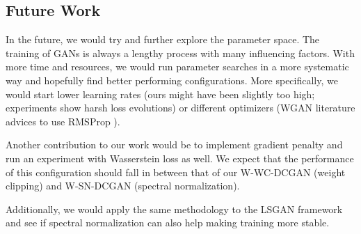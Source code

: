 
\subsection{Future Work}
In the future, we would try and further explore the parameter space. The training of GANs is always a lengthy process with many influencing factors. With more time and resources, we would run parameter searches in a more systematic way and hopefully find better performing configurations. More specifically, we would start lower learning rates (ours might have been slightly too high; experiments show harsh loss evolutions) or different optimizers (WGAN literature advices to use RMSProp \cite{arjovsky2017wasserstein}).

Another contribution to our work would be to implement gradient penalty and run an experiment with Wasserstein loss as well. We expect that the performance of this configuration should fall in between that of our W-WC-DCGAN (weight clipping) and W-SN-DCGAN (spectral normalization).

Additionally, we would apply the same methodology to the LSGAN framework \cite{mao2017least} and see if spectral normalization can also help making training more stable. 
